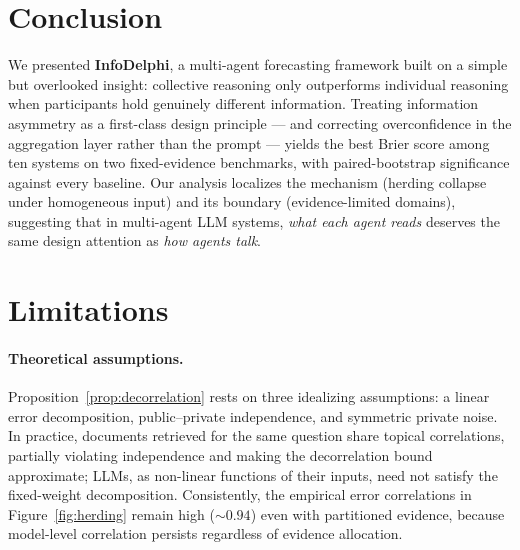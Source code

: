 \section{Conclusion}
\label{sec:conclusion}
We presented \textbf{InfoDelphi}, a multi-agent forecasting framework built on a simple but overlooked insight: collective reasoning only outperforms individual reasoning when participants hold genuinely different information.
Treating information asymmetry as a first-class design principle --- and correcting overconfidence in the aggregation layer rather than the prompt --- yields the best Brier score among ten systems on two fixed-evidence benchmarks, with paired-bootstrap significance against every baseline.
Our analysis localizes the mechanism (herding collapse under homogeneous input) and its boundary (evidence-limited domains), suggesting that in multi-agent LLM systems, \emph{what each agent reads} deserves the same design attention as \emph{how agents talk}.

\section*{Limitations}

\paragraph{Theoretical assumptions.}
Proposition~\ref{prop:decorrelation} rests on three idealizing assumptions: a linear error decomposition, public--private independence, and symmetric private noise. In practice, documents retrieved for the same question share topical correlations, partially violating independence and making the decorrelation bound approximate; LLMs, as non-linear functions of their inputs, need not satisfy the fixed-weight decomposition.
Consistently, the empirical error correlations in Figure~\ref{fig:herding} remain high (${\sim}0.94$) even with partitioned evidence, because model-level correlation persists regardless of evidence allocation.

